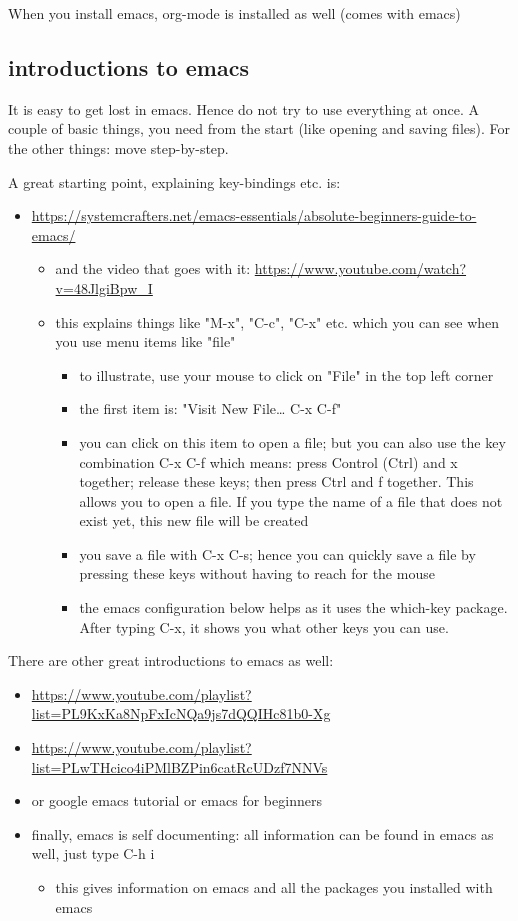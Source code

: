 \documentclass[11pt]{article}
\begin{document}
When you install emacs, org-mode is installed as well (comes with emacs)


\subsection{introductions to emacs}
\label{sec:orgd97a38d}

It is easy to get lost in emacs. Hence do not try to use everything at once. A couple of basic things, you need from the start (like opening and saving files). For the other things: move step-by-step. 

A great starting point, explaining key-bindings etc. is:
\begin{itemize}
\item \url{https://systemcrafters.net/emacs-essentials/absolute-beginners-guide-to-emacs/}
\begin{itemize}
\item and the video that goes with it: \url{https://www.youtube.com/watch?v=48JlgiBpw\_I}
\item this explains things like "M-x", "C-c", "C-x" etc. which you can see when you use menu items like "file"
\begin{itemize}
\item to illustrate, use your mouse to click on "File" in the top left corner
\item the first item is: "Visit New File\ldots{} C-x C-f"
\item you can click on this item to open a file; but you can also use the key combination C-x C-f which means: press Control (Ctrl) and x together; release these keys; then press Ctrl and f together. This allows you to open a file. If you type the name of a file that does not exist yet, this new file will be created
\item you save a file with C-x C-s; hence you can quickly save a file by pressing these keys without having to reach for the mouse
\item the emacs configuration below helps as it uses the which-key package. After typing C-x, it shows you what other keys you can use.
\end{itemize}
\end{itemize}
\end{itemize}

There are other great introductions to emacs as well:
\begin{itemize}
\item \url{https://www.youtube.com/playlist?list=PL9KxKa8NpFxIcNQa9js7dQQIHc81b0-Xg}
\item \url{https://www.youtube.com/playlist?list=PLwTHcico4iPMlBZPin6catRcUDzf7NNVs}
\item or google emacs tutorial or emacs for beginners
\item finally, emacs is self documenting: all information can be found in emacs as well, just type C-h i
\begin{itemize}
\item this gives information on emacs and all the packages you installed with emacs
\end{itemize}
\end{itemize}
\end{document}
